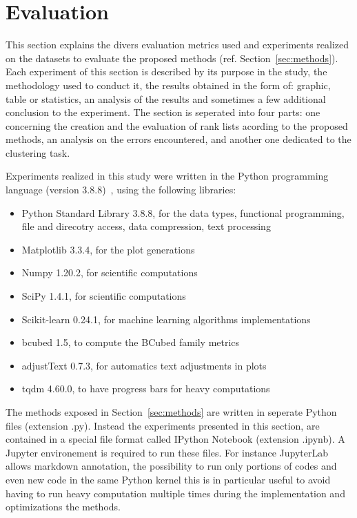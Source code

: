 \section{Evaluation \label{sec:evaluation}}

This section explains the divers evaluation metrics used and experiments realized on the datasets to evaluate the proposed methods (ref. Section~\ref{sec:methods}).
Each experiment of this section is described by its purpose in the study, the methodology used to conduct it, the results obtained in the form of: graphic, table or statistics, an analysis of the results and sometimes a few additional conclusion to the experiment.
The section is seperated into four parts: one concerning the creation and the evaluation of rank lists acording to the proposed methods, an analysis on the errors encountered, and another one dedicated to the clustering task.

Experiments realized in this study were written in the Python programming language (version 3.8.8)~\cite{python}, using the following libraries:
\begin{itemize}
  \item Python Standard Library 3.8.8, for the data types, functional programming, file and direcotry access, data compression, text processing~\cite{python_standard_library}
  \item Matplotlib 3.3.4, for the plot generations~\cite{matplotlib}
  \item Numpy 1.20.2, for scientific computations~\cite{numpy}
  \item SciPy 1.4.1, for scientific computations~\cite{scipy}
  \item Scikit-learn 0.24.1, for machine learning algorithms implementations~\cite{sklearn}
  \item bcubed 1.5, to compute the BCubed family metrics~\cite{bcubed_gh}
  \item adjustText 0.7.3, for automatics text adjustments in plots~\cite{adjustText}
  \item tqdm 4.60.0, to have progress bars for heavy computations~\cite{tqdm}
\end{itemize}
The methods exposed in Section~\ref{sec:methods} are written in seperate Python files (extension .py).
Instead the experiments presented in this section, are contained in a special file format called IPython Notebook (extension .ipynb).
A Jupyter environement is required to run these files.
For instance JupyterLab allows markdown annotation, the possibility to run only portions of codes and even new code in the same Python kernel this is in particular useful to avoid having to run heavy computation multiple times during the implementation and optimizations the methods.






